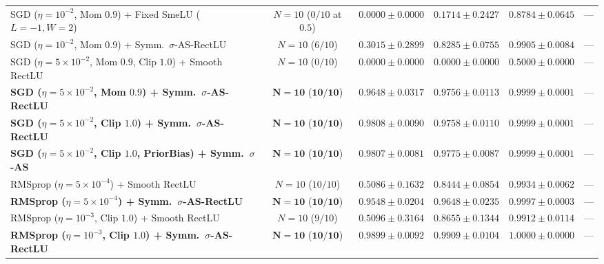 \documentclass[11pt, a4paper]{article}
\begin{document}
\begin{table}[htbp]
{\begin{tabular}{lccccc}
SGD ($\eta=10^{-2}$, Mom $0.9$) + Fixed SmeLU ($L=-1, W=2$) & $N=10$ ($0/10$ at $0.5$) & $0.0000 \pm 0.0000$ & $0.1714 \pm 0.2427$ & $0.8784 \pm 0.0645$ & --- \\
SGD ($\eta=10^{-2}$, Mom $0.9$) + Symm.\ $\sigma$-AS-RectLU & $N=10$ ($6/10$) & $0.3015 \pm 0.2899$ & $0.8285 \pm 0.0755$ & $0.9905 \pm 0.0084$ & --- \\
SGD ($\eta=5\times 10^{-2}$, Mom $0.9$, Clip $1.0$) + Smooth RectLU & $N=10$ ($0/10$) & $0.0000 \pm 0.0000$ & $0.0000 \pm 0.0000$ & $0.5000 \pm 0.0000$ & --- \\
\textbf{SGD ($\eta=5\times 10^{-2}$, Mom $0.9$) + Symm.\ $\sigma$-AS-RectLU} & $\mathbf{N=10}$ ($\mathbf{10/10}$) & $\mathbf{0.9648 \pm 0.0317}$ & $\mathbf{0.9756 \pm 0.0113}$ & $\mathbf{0.9999 \pm 0.0001}$ & --- \\
\textbf{SGD ($\eta=5\times 10^{-2}$, Clip $1.0$) + Symm.\ $\sigma$-AS-RectLU} & $\mathbf{N=10}$ ($\mathbf{10/10}$) & $\mathbf{0.9808 \pm 0.0090}$ & $\mathbf{0.9758 \pm 0.0110}$ & $\mathbf{0.9999 \pm 0.0001}$ & --- \\
\textbf{SGD ($\eta=5\times 10^{-2}$, Clip $1.0$, PriorBias) + Symm.\ $\sigma$-AS} & $\mathbf{N=10}$ ($\mathbf{10/10}$) & $\mathbf{0.9807 \pm 0.0081}$ & $\mathbf{0.9775 \pm 0.0087}$ & $\mathbf{0.9999 \pm 0.0001}$ & --- \\
\hline
RMSprop ($\eta=5\times 10^{-4}$) + Smooth RectLU & $N=10$ ($10/10$) & $0.5086 \pm 0.1632$ & $0.8444 \pm 0.0854$ & $0.9934 \pm 0.0062$ & --- \\
\textbf{RMSprop ($\eta=5\times 10^{-4}$) + Symm.\ $\sigma$-AS-RectLU} & $\mathbf{N=10}$ ($\mathbf{10/10}$) & $\mathbf{0.9548 \pm 0.0204}$ & $\mathbf{0.9648 \pm 0.0235}$ & $\mathbf{0.9997 \pm 0.0003}$ & --- \\
RMSprop ($\eta=10^{-3}$, Clip $1.0$) + Smooth RectLU & $N=10$ ($9/10$) & $0.5096 \pm 0.3164$ & $0.8655 \pm 0.1344$ & $0.9912 \pm 0.0114$ & --- \\
\textbf{RMSprop ($\eta=10^{-3}$, Clip $1.0$) + Symm.\ $\sigma$-AS-RectLU} & $\mathbf{N=10}$ ($\mathbf{10/10}$) & $\mathbf{0.9899 \pm 0.0092}$ & $\mathbf{0.9909 \pm 0.0104}$ & $\mathbf{1.0000 \pm 0.0000}$ & --- \\
\hline
\end{tabular}%
}
\end{table}
\end{document}
